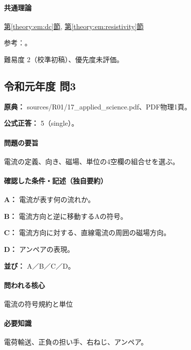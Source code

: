 \paragraph{共通理論} \hyperref[theory:em:dc]{第\ref*{theory:em:dc}節}, \hyperref[theory:em:resistivity]{第\ref*{theory:em:resistivity}節}

\par 参考：\cite{mit_em06}。

\par 難易度 2（校準初稿）、優先度未評価。

\subsection{令和元年度 問3}
\label{q:r01-reg-applied-03}

\noindent\textbf{原典：} sources/R01/17\_applied\_science.pdf、PDF物理1頁。

\textbf{公式正答：} 5（single）。

\paragraph{問題の要旨} 電流の定義、向き、磁場、単位の4空欄の組合せを選ぶ。

\paragraph{確認した条件・記述（独自要約）}\mbox{}\par

\noindent\textbf{A：} 電流が表す何の流れか。\par

\noindent\textbf{B：} 電流方向と逆に移動するAの符号。\par

\noindent\textbf{C：} 電流方向に対する、直線電流の周囲の磁場方向。\par

\noindent\textbf{D：} アンペアの表現。\par

\noindent\textbf{並び：} A／B／C／D。\par

\paragraph{問われる核心} 電流の符号規約と単位

\paragraph{必要知識} 電荷輸送、正負の担い手、右ねじ、アンペア。

